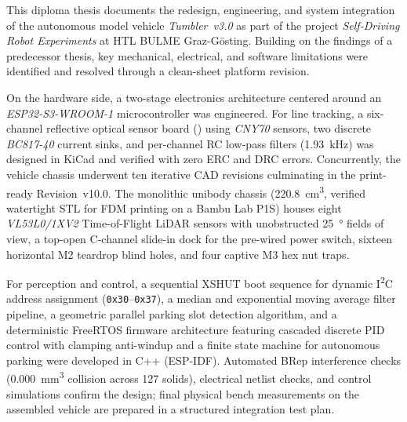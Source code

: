 This diploma thesis documents the redesign, engineering, and system integration of the autonomous model vehicle \emph{Tumbler~v3.0} as part of the project \emph{Self-Driving Robot Experiments} at HTL BULME Graz-Gösting. Building on the findings of a predecessor thesis, key mechanical, electrical, and software limitations were identified and resolved through a clean-sheet platform revision.

On the hardware side, a two-stage electronics architecture centered around an \emph{ESP32-S3-WROOM-1} microcontroller was engineered. For line tracking, a six-channel reflective optical sensor board () using \emph{CNY70} sensors, two discrete \emph{BC817-40} current sinks, and per-channel RC low-pass filters (\qty{1,93}{\kilo\hertz}) was designed in KiCad and verified with zero ERC and DRC errors. Concurrently, the vehicle chassis underwent ten iterative CAD revisions culminating in the print-ready Revision~v10.0. The monolithic unibody chassis (\qty{220,8}{\centi\meter\cubed}, verified watertight STL for FDM printing on a Bambu Lab P1S) houses eight \emph{VL53L0/1XV2} Time-of-Flight LiDAR sensors with unobstructed \qty{25}{\degree} fields of view, a top-open C-channel slide-in dock for the pre-wired power switch, sixteen horizontal M2 teardrop blind holes, and four captive M3 hex nut traps.

For perception and control, a sequential XSHUT boot sequence for dynamic I\textsuperscript{2}C address assignment (\texttt{0x30}--\texttt{0x37}), a median and exponential moving average filter pipeline, a geometric parallel parking slot detection algorithm, and a deterministic FreeRTOS firmware architecture featuring cascaded discrete PID control with clamping anti-windup and a finite state machine for autonomous parking were developed in C++ (ESP-IDF). Automated BRep interference checks (\qty{0,000}{\milli\meter\cubed} collision across 127 solids), electrical netlist checks, and control simulations confirm the design; final physical bench measurements on the assembled vehicle are prepared in a structured integration test plan.
